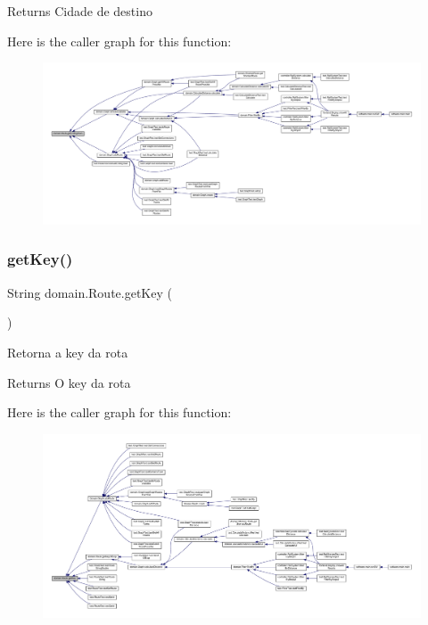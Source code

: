 \begin{DoxyReturn}{Returns}
Cidade de destino 
\end{DoxyReturn}
Here is the caller graph for this function\+:\nopagebreak
\begin{figure}[H]
\begin{center}
\leavevmode
\includegraphics[width=350pt]{classdomain_1_1_route_a914f727c54adab3aa1a62f61c997dcdd_icgraph}
\end{center}
\end{figure}
\mbox{\label{classdomain_1_1_route_a5a9ed7d2692549002ab7ae59a3b5b5d9}} 
\subsubsection{\texorpdfstring{get\+Key()}{getKey()}}
{\footnotesize\ttfamily String domain.\+Route.\+get\+Key (\begin{DoxyParamCaption}{ }\end{DoxyParamCaption})}

Retorna a key da rota

\begin{DoxyReturn}{Returns}
O key da rota 
\end{DoxyReturn}
Here is the caller graph for this function\+:\nopagebreak
\begin{figure}[H]
\begin{center}
\leavevmode
\includegraphics[width=350pt]{classdomain_1_1_route_a5a9ed7d2692549002ab7ae59a3b5b5d9_icgraph}
\end{center}
\end{figure}
\mbox{\label{classdomain_1_1_route_aec22d9627aa0a3afd7bf20a61a0f4695}} 
